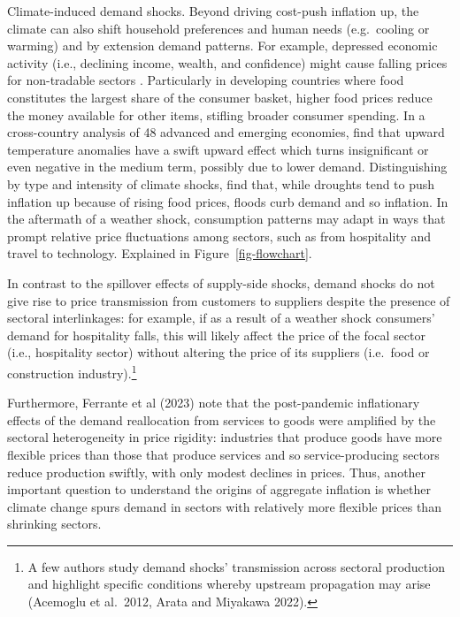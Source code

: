 \documentclass[
  letterpaper,
  DIV=11,
  numbers=noendperiod]{scrartcl}
\begin{document}
Climate-induced demand shocks. Beyond driving cost-push inflation up,
the climate can also shift household preferences and human needs
(e.g.~cooling or warming) and by extension demand patterns. For example,
depressed economic activity (i.e., declining income, wealth, and
confidence) might cause falling prices for non-tradable sectors
\citep{kamber2013}. Particularly in developing countries where food
constitutes the largest share of the consumer basket, higher food prices
reduce the money available for other items, stifling broader consumer
spending. In a cross-country analysis of 48 advanced and emerging
economies, \citet{faccia2021} find that upward temperature anomalies
have a swift upward effect which turns insignificant or even negative in
the medium term, possibly due to lower demand. Distinguishing by type
and intensity of climate shocks, \citet{Kabundi2022} find that, while
droughts tend to push inflation up because of rising food prices, floods
curb demand and so inflation. In the aftermath of a weather shock,
consumption patterns may adapt in ways that prompt relative price
fluctuations among sectors, such as from hospitality and travel to
technology. Explained in Figure~\ref{fig-flowchart}.

In contrast to the spillover effects of supply-side shocks, demand
shocks do not give rise to price transmission from customers to
suppliers despite the presence of sectoral interlinkages: for example,
if as a result of a weather shock consumers' demand for hospitality
falls, this will likely affect the price of the focal sector (i.e.,
hospitality sector) without altering the price of its suppliers
(i.e.~food or construction industry).\footnote{A few authors study
  demand shocks' transmission across sectoral production and highlight
  specific conditions whereby upstream propagation may arise (Acemoglu
  et al.~2012, Arata and Miyakawa 2022).}

Furthermore, Ferrante et al (2023) note that the post-pandemic
inflationary effects of the demand reallocation from services to goods
were amplified by the sectoral heterogeneity in price rigidity:
industries that produce goods have more flexible prices than those that
produce services and so service-producing sectors reduce production
swiftly, with only modest declines in prices. Thus, another important
question to understand the origins of aggregate inflation is whether
climate change spurs demand in sectors with relatively more flexible
prices than shrinking sectors.
\end{document}
